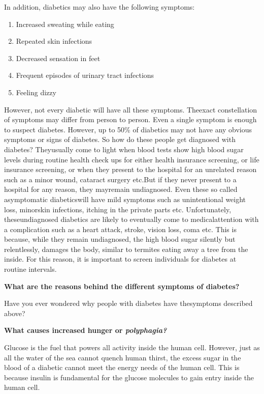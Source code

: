In addition, diabetics may also have the following symptoms:

\vspace{-\topsep}
\begin{enumerate}[\ding{226}]
\itemsep=0pt
\item Increased sweating while eating
\item Repeated skin infections
\item Decreased sensation in feet
\item Frequent episodes of urinary tract infections
\item Feeling dizzy
 \end{enumerate}
 \vspace{-\topsep}

However, not every diabetic will have all these symptoms. The\break exact constellation of symptoms may differ from person to person. Even a single symptom is enough to suspect diabetes. However, up to 50\% of diabetics may not have any obvious symptoms or signs of diabetes. So how do these people get diagnosed with diabetes? They\break usually come to light when blood tests show high blood sugar levels during routine health check ups for either health insurance scree\-ning, or life insurance screening, or when they present to the hospital for an un\-related reason such as a minor wound, cataract surgery etc.\break But if they never present to a hospital for any reason, they may\break remain undia\-gnosed. Even these so called asymptomatic diabetics\break will have mild symptoms such as unintentional weight loss, minor\break skin infections, itching in the private parts etc. Unfortunately, these\break undiagno\-sed dia\-betics are likely to eventually come to medical\break attention with a compli\-cation such as a heart attack, stroke, vision loss, coma etc. This is because, while they remain undiagnosed, the high blood sugar silently but relentlessly, damages the body, similar to termites eating away a tree from the inside. For this reason, it is important to screen indi\-viduals for diabetes at routine intervals.

\noindent
\textbf{What are the reasons behind the different symptoms of diabetes?}

Have you ever wondered why people with diabetes have the\break symptoms described above?

\noindent
\textbf{What causes increased hunger or \textit{polyphagia?}}

Glucose is the fuel that powers all activity inside the human cell. However, just as all the water of the sea cannot quench human thirst, the excess sugar in the blood of a diabetic cannot meet the energy needs of the human cell. This is because insulin is fundamental for the glucose molecules to gain entry inside the human cell.

